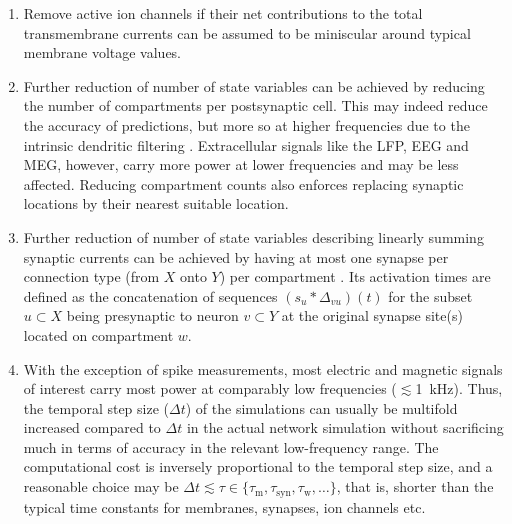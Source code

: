 \begin{enumerate}
\item Remove active ion channels  if their net contributions to the total transmembrane currents can be assumed to be miniscular around typical membrane voltage values. 

\item Further reduction of number of state variables 
can be achieved by reducing the number of compartments per postsynaptic cell. 
This may indeed reduce the accuracy of  predictions, 
but more so at higher frequencies due to the intrinsic dendritic filtering . 
Extracellular signals like the LFP, EEG and MEG, however, carry more power at lower frequencies and may be less affected. 
Reducing compartment counts also enforces replacing synaptic locations by their nearest suitable location.

\item Further reduction of number of state variables describing linearly summing synaptic currents can be achieved by having at most one synapse per connection type (from $X$ onto $Y$) per compartment .
Its activation times are defined as the concatenation of sequences $\left(s_u \ast \Delta_{vu} \right)(t)$ for the subset $u \subset X$ being presynaptic to neuron $v \subset Y$ at the original synapse site(s) located on compartment $w$. 

\item With the exception of spike measurements, most electric and magnetic signals of interest carry most power at comparably low frequencies ($\lesssim$\SI{1}{\kilo\hertz}).
Thus, the temporal step size ($\Delta t$) of the simulations can usually be multifold increased compared to $\Delta t$ in the actual network simulation without sacrificing much in terms of accuracy in the relevant low-frequency range.
The computational cost is inversely proportional to the temporal step size,
and a reasonable choice may be $\Delta t \lesssim \tau \in \{ \tau_\text{m}, \tau_\text{syn}, \tau_\text{w}, \ldots \}$,
that is, shorter than the typical time constants for membranes, synapses, ion channels etc.

\end{enumerate}

